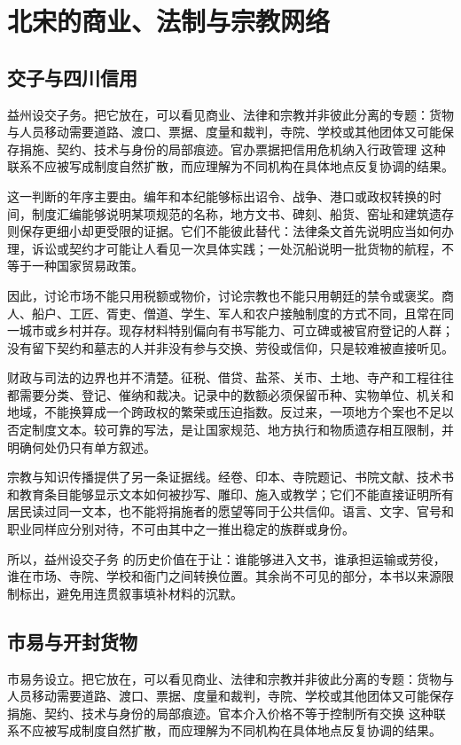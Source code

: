 \section{北宋的商业、法制与宗教网络}

\subsection{交子与四川信用}

益州设交子务。把它放在，可以看见商业、法律和宗教并非彼此分离的专题：货物与人员移动需要道路、渡口、票据、度量和裁判，寺院、学校或其他团体又可能保存捐施、契约、技术与身份的局部痕迹。官办票据把信用危机纳入行政管理 这种联系不应被写成制度自然扩散，而应理解为不同机构在具体地点反复协调的结果。

这一判断的年序主要由。编年和本纪能够标出诏令、战争、港口或政权转换的时间，制度汇编能够说明某项规范的名称，地方文书、碑刻、船货、窑址和建筑遗存则保存更细小却更受限的证据。它们不能彼此替代：法律条文首先说明应当如何办理，诉讼或契约才可能让人看见一次具体实践；一处沉船说明一批货物的航程，不等于一种国家贸易政策。

因此，讨论市场不能只用税额或物价，讨论宗教也不能只用朝廷的禁令或褒奖。商人、船户、工匠、胥吏、僧道、学生、军人和农户接触制度的方式不同，且常在同一城市或乡村并存。现存材料特别偏向有书写能力、可立碑或被官府登记的人群；没有留下契约和墓志的人并非没有参与交换、劳役或信仰，只是较难被直接听见。

财政与司法的边界也并不清楚。征税、借贷、盐茶、关市、土地、寺产和工程往往都需要分类、登记、催纳和裁决。记录中的数额必须保留币种、实物单位、机关和地域，不能换算成一个跨政权的繁荣或压迫指数。反过来，一项地方个案也不足以否定制度文本。较可靠的写法，是让国家规范、地方执行和物质遗存相互限制，并明确何处仍只有单方叙述。

宗教与知识传播提供了另一条证据线。经卷、印本、寺院题记、书院文献、技术书和教育条目能够显示文本如何被抄写、雕印、施入或教学；它们不能直接证明所有居民读过同一文本，也不能将捐施者的愿望等同于公共信仰。语言、文字、官号和职业同样应分别对待，不可由其中之一推出稳定的族群或身份。

所以，益州设交子务 的历史价值在于让：谁能够进入文书，谁承担运输或劳役，谁在市场、寺院、学校和衙门之间转换位置。其余尚不可见的部分，本书以来源限制标出，避免用连贯叙事填补材料的沉默。

\subsection{市易与开封货物}

市易务设立。把它放在，可以看见商业、法律和宗教并非彼此分离的专题：货物与人员移动需要道路、渡口、票据、度量和裁判，寺院、学校或其他团体又可能保存捐施、契约、技术与身份的局部痕迹。官本介入价格不等于控制所有交换 这种联系不应被写成制度自然扩散，而应理解为不同机构在具体地点反复协调的结果。

